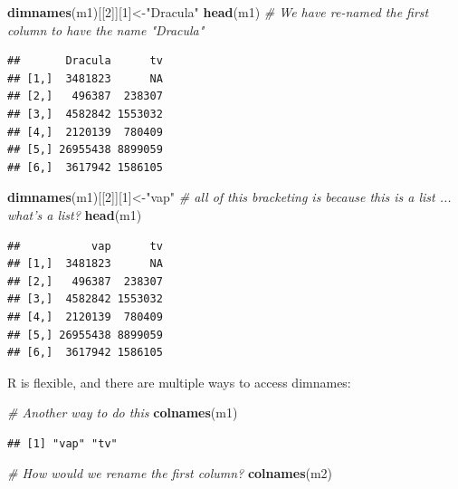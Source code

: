 \documentclass[]{article}
\newenvironment{Shaded}{\begin{snugshade}}{\end{snugshade}}
\newcommand{\KeywordTok}[1]{\textcolor[rgb]{0.13,0.29,0.53}{\textbf{#1}}}
\newcommand{\DecValTok}[1]{\textcolor[rgb]{0.00,0.00,0.81}{#1}}
\newcommand{\StringTok}[1]{\textcolor[rgb]{0.31,0.60,0.02}{#1}}
\newcommand{\CommentTok}[1]{\textcolor[rgb]{0.56,0.35,0.01}{\textit{#1}}}
\newcommand{\NormalTok}[1]{#1}
\begin{document}
\begin{Shaded}
\begin{Highlighting}[]
\KeywordTok{dimnames}\NormalTok{(m1)[[}\DecValTok{2}\NormalTok{]][}\DecValTok{1}\NormalTok{]<-}\StringTok{"Dracula"}
\KeywordTok{head}\NormalTok{(m1) }\CommentTok{# We have re-named the first column to have the name "Dracula"}
\end{Highlighting}
\end{Shaded}

\begin{verbatim}
##       Dracula      tv
## [1,]  3481823      NA
## [2,]   496387  238307
## [3,]  4582842 1553032
## [4,]  2120139  780409
## [5,] 26955438 8899059
## [6,]  3617942 1586105
\end{verbatim}

\begin{Shaded}
\begin{Highlighting}[]
\KeywordTok{dimnames}\NormalTok{(m1)[[}\DecValTok{2}\NormalTok{]][}\DecValTok{1}\NormalTok{]<-}\StringTok{"vap"} \CommentTok{# all of this bracketing is because this is a list ... what's a list?}
\KeywordTok{head}\NormalTok{(m1)}
\end{Highlighting}
\end{Shaded}

\begin{verbatim}
##           vap      tv
## [1,]  3481823      NA
## [2,]   496387  238307
## [3,]  4582842 1553032
## [4,]  2120139  780409
## [5,] 26955438 8899059
## [6,]  3617942 1586105
\end{verbatim}

R is flexible, and there are multiple ways to access dimnames:

\begin{Shaded}
\begin{Highlighting}[]
\CommentTok{# Another way to do this}
\KeywordTok{colnames}\NormalTok{(m1)}
\end{Highlighting}
\end{Shaded}

\begin{verbatim}
## [1] "vap" "tv"
\end{verbatim}

\begin{Shaded}
\begin{Highlighting}[]
\CommentTok{# How would we rename the first column?}
\KeywordTok{colnames}\NormalTok{(m2)}
\end{Highlighting}
\end{Shaded}
\end{document}
